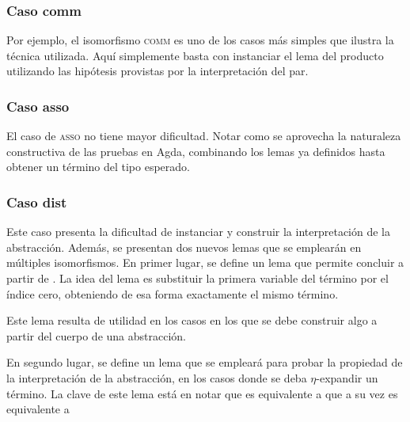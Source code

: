 \subsubsection{Caso comm}

Por ejemplo, el isomorfismo \textsc{comm} es uno de los casos más simples que ilustra la técnica utilizada.
Aquí simplemente basta con instanciar el lema del producto utilizando las hipótesis provistas por la interpretación del par.


\subsubsection{Caso asso}

El caso de \textsc{asso} no tiene mayor dificultad.
Notar como se aprovecha la naturaleza constructiva de las pruebas en Agda, combinando los lemas ya definidos hasta obtener un término del tipo esperado.


\subsubsection{Caso dist}

Este caso presenta la dificultad de instanciar y construir la interpretación de la abstracción.
Además, se presentan dos nuevos lemas que se emplearán en múltiples isomorfismos.
En primer lugar, se define un lema que permite concluir \snstar{} a partir de \snstar {} .
La idea del lema es substituir la primera variable del término por el índice cero, obteniendo de esa forma exactamente el mismo término.


Este lema resulta de utilidad en los casos en los que se debe construir algo a partir del cuerpo de una abstracción.


En segundo lugar, se define un lema que se empleará para probar la propiedad de la interpretación de la abstracción, en los casos donde se deba $\eta$-expandir un término.
La clave de este lema está en notar que 
es equivalente a  que a su vez es equivalente a  \bound{$\rho$} 


